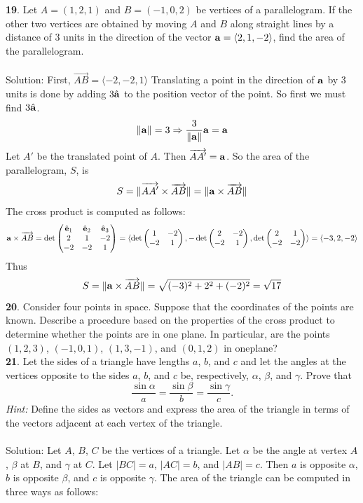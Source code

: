 \documentclass[12pt]{amsbook}
\newcommand{\la}{\langle}
\newcommand{\ra}{\rangle}
\begin{document}
\\
\\
{\small\bf 19}. Let $A=(1,2,1)$ and $B=(-1,0,2)$ be vertices of a
parallelogram. If the other two vertices are obtained by moving
$A$ and $B$ 
along straight lines by a distance of 3 units in the direction of
the vector  ${\bf a}=\la
2,1,-2\ra$, find the area of the  parallelogram.\\
\\
{\sc Solution}: First, $\overrightarrow{AB}=\la -2,-2,1 \ra$ Translating a point in the direction of ${\bf a}$ by 3 units is done by adding $3\hat{\bf a}$ to the position vector of the point. So first we must find $3\hat{\bf a}$.
$$\|{\bf a}\|=3 \Rightarrow \frac{3}{\|{\bf a}\|}{\bf a}=\bf a$$
Let $A'$ be the translated point of $A$. Then $\overrightarrow{AA'}=\bf a$. So the area of the parallelogram, $S$, is
$$S=\|\overrightarrow{AA'}\times\overrightarrow{AB}\|=\|{\bf a}\times\overrightarrow{AB}\|$$
The cross product is computed as follows:
$${\bf a}\times{\overrightarrow{AB}}=\det\begin{pmatrix} \hat{\bf e}_1 & \hat{\bf e}_2 & \hat{\bf e}_3\cr 2&1&-2\cr -2&-2&1 \cr \end{pmatrix}= \la \det\begin{pmatrix}
1&-2\cr -2&1\cr \end{pmatrix},-\det\begin{pmatrix} 2&-2\cr -2&1\cr \end{pmatrix},\det\begin{pmatrix} 2&1\cr -2&-2\cr \end{pmatrix}\ra =\la -3,2,-2 \ra $$
Thus
$$S=\|{\bf a}\times\overrightarrow{AB}\|=\sqrt{(-3)^2+2^2+(-2)^2}=\sqrt{17}$$
{\small\bf 20}. Consider four points in space. Suppose that the
coordinates of the points are known. Describe a procedure 
based on the properties of the cross product
to determine whether the points are in one plane.
In particular, are the points $(1,2,3)$, $(-1,0,1)$, $(1,3,-1)$,
and $(0,1,2)$ in one\break plane?\\
{\small\bf 21}. Let the sides of a triangle have lengths $a$, $b$, and
$c$ and let the angles at the vertices opposite to the sides $a$,
$b$, and $c$ be, respectively, $\alpha$, $\beta$, and $\gamma$.
Prove that $$
\frac{\sin\alpha}{a}=\frac{\sin\beta}{b}=\frac{\sin\gamma}{c}. $$
{\it Hint:} Define the sides as vectors and express the area of
the triangle in terms of the vectors adjacent at each vertex of the triangle.\\
\\
{\sc Solution}: Let $A$, $B$, $C$ be the vertices of a triangle. Let $\alpha$ be the angle at vertex $A$, $\beta$ at $B$, and $\gamma$ at $C$. Let $|BC|=a$, $|AC|=b$, and $|AB|=c$. Then $a$ is opposite $\alpha$, $b$ is opposite $\beta$, and $c$ is opposite $\gamma$. The area of the triangle can be computed in three ways as follows:
\end{document}
